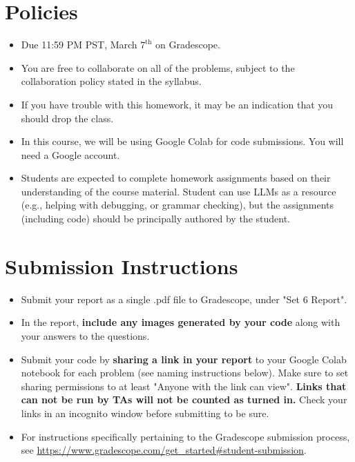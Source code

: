\newif\ifshowsolutions
\showsolutionstrue







\pagestyle{fancy}


\section*{Policies}
\begin{itemize}
	\item Due 11:59 PM PST, March $7^\text{th}$ on Gradescope. 
	\item You are free to collaborate on all of the problems, subject to the collaboration policy stated in the syllabus.
	\item If you have trouble with this homework, it may be an indication that you should drop the class.
	\item In this course, we will be using Google Colab for code submissions. You will need a Google account.
  \item Students are expected to complete homework assignments based on their understanding of the course material. Student can use LLMs as a resource (e.g., helping with debugging, or grammar checking), but the assignments (including code) should be principally authored by the student.
\end{itemize}

\section*{Submission Instructions}

\begin{itemize}
	\item Submit your report as a single .pdf file to Gradescope, under "Set 6 Report". 
	\item In the report, \textbf{include any images generated by your code} along with your answers to the questions.
	\item Submit your code by \textbf{sharing a link in your report} to your Google Colab notebook for each problem (see naming instructions below). Make sure to set sharing permissions to at least "Anyone with the link can view". \textbf{Links that can not be run by TAs will not be counted as turned in.} Check your links in an incognito window before submitting to be sure. 
	\item For instructions specifically pertaining to the Gradescope submission process, see \url{https://www.gradescope.com/get_started#student-submission}.
	
\end{itemize}


